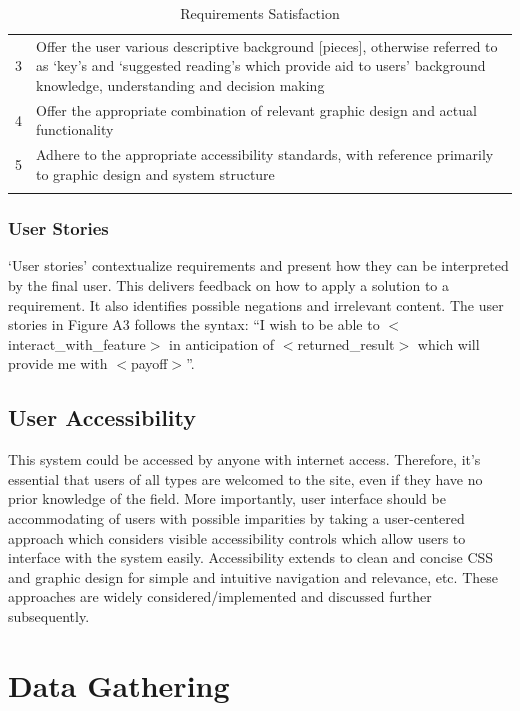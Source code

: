 \documentclass[11pt, english]{article}
\begin{document}
\begin{center}
\begin{longtable}{cp{10cm}}
		3 & Offer the user various descriptive background [pieces], otherwise referred to as `key's and `suggested reading's which provide aid to users' background knowledge, understanding and decision making\\
		4 & Offer the appropriate combination of relevant graphic design and actual functionality\\
		5 & Adhere to the appropriate accessibility standards, with reference primarily to graphic design and system structure\\
		\hline
		\caption{Requirements Satisfaction}
	\end{longtable}
	\end{center}

		\subsubsection{User Stories}

	`User stories' contextualize requirements and present how they can be interpreted by the final user. This delivers feedback on how to apply a solution to a requirement. It also identifies possible negations and irrelevant content. The user stories in Figure A3 follows the syntax: ``I wish to be able to $<$interact\_with\_feature$>$ in anticipation of $<$returned\_result$>$ which will provide me with $<$payoff$>$''.

	\subsection{User Accessibility}

	This system could be accessed by anyone with internet access. Therefore, it's essential that users of all types are welcomed to the site, even if they have no prior knowledge of the field. More importantly, user interface should be accommodating of users with possible imparities by taking a user-centered approach which considers visible accessibility controls which allow users to interface with the system easily. Accessibility extends to clean and concise CSS and graphic design for simple and intuitive navigation and relevance, etc. These approaches are widely considered/implemented and discussed further subsequently.\\

\newpage

\section{Data Gathering}\label{ch4}
\end{document}
